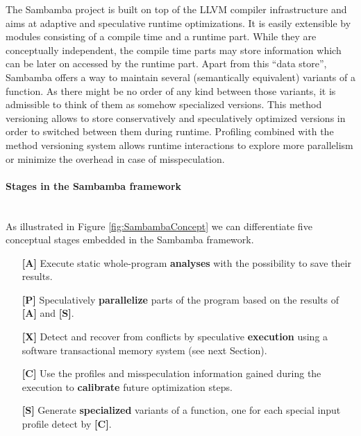 The Sambamba project is built on top of the LLVM compiler infrastructure and 
aims at adaptive and speculative runtime optimizations.
It is easily extensible by modules consisting of a
compile time and a runtime part. 
While they are conceptually independent,
the compile time parts may store information which can be later on accessed
by the runtime part. Apart from this ``data store'', Sambamba offers a way to 
maintain several (semantically equivalent) variants of a function. As there might be 
no order of any kind between those variants, it is admissible to think of them 
as somehow specialized versions. This method versioning allows to store 
conservatively and speculatively optimized versions in order to switched between 
them during runtime. 
Profiling combined with the method versioning system allows runtime interactions
to explore more parallelism or minimize the overhead in case of misspeculation. 

\paragraph{Stages in the Sambamba framework}~\\ 
As illustrated in Figure \ref{fig:SambambaConcept} we can differentiate five 
conceptual stages embedded in the Sambamba framework.

{\begin{list}{}
    {\setlength{\leftmargin}{-0mm}}
  \item[]
\begin{enumerate}
  \item[\textbf{[A]}] Execute static whole-program \textbf{analyses}  
  with the possibility to save their results.
\item[\textbf{[P]}] Speculatively \textbf{parallelize} parts of the program
  based on the results of \textbf{[A]} and \textbf{[S]}.
\item[\textbf{[X]}] Detect and recover from conflicts by speculative
  \textbf{execution} using a software transactional memory system (see next Section).
\item[\textbf{[C]}] Use the profiles and misspeculation information gained 
  during the execution to \textbf{calibrate} future optimization steps.
\item[\textbf{[S]}] Generate \textbf{specialized} variants of a function, 
 one for each special input profile detect by \textbf{[C]}. 
\end{enumerate}
\end{list}
}


